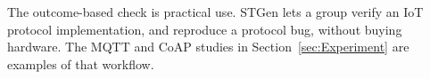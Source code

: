 \documentclass[jsan,article,submit,moreauthors,pdftex]{Definitions/mdpi}
\begin{document}
The outcome-based check is practical use. STGen lets a group verify an {IoT} protocol implementation, and reproduce a protocol bug, without buying hardware. The MQTT and CoAP studies in Section~\ref{sec:Experiment} are examples of that workflow.






\end{document}
